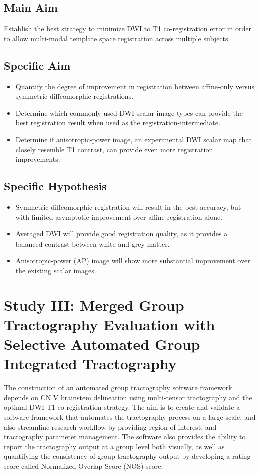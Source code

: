 \subsection{Main Aim}
Establish the best strategy to minimize DWI to T1 co-registration error in order to allow multi-modal template space registration across multiple subjects.

\subsection{Specific Aim}
\begin{itemize}
    \item Quantify the degree of improvement in registration between affine-only versus symmetric-diffeomorphic registrations.
    \item Determine which commonly-used DWI scalar image types can provide the best registration result when used as the registration-intermediate.
    \item Determine if anisotropic-power image, an experimental DWI scalar map that closely resemble T1 contrast, can provide even more registration improvements. 
\end{itemize}

\subsection{Specific Hypothesis}
\begin{itemize}
    \item Symmetric-diffeomorphic registration will result in the best accuracy, but with limited asymptotic improvement over affine registration alone.
    \item Averaged DWI will provide good registration quality, as it provides a balanced contrast between white and grey matter.
    \item Anisotropic-power (AP) image will show more substantial improvement over the existing scalar images.
\end{itemize}

\section{Study III: Merged Group Tractography Evaluation with Selective Automated Group Integrated Tractography}
The construction of an automated group tractography software framework depends on CN V brainstem delineation using multi-tensor tractography and the optimal DWI-T1 co-registration strategy. The aim is to create and validate a software framework that automates the tractography process on a large-scale, and also streamline research workflow by providing region-of-interest, and tractography parameter management. The software also provides the ability to report the tractography output at a group level both visually, as well as quantifying the consistency of group tractography output by developing a rating score called Normalized Overlap Score (NOS) score. 


